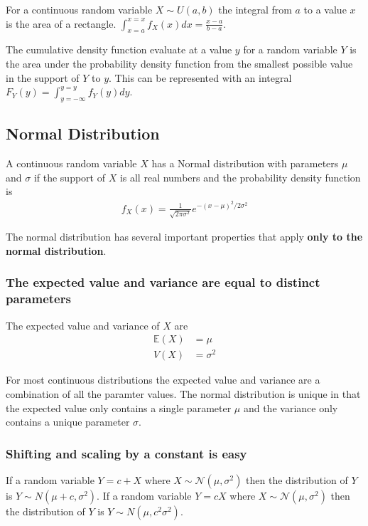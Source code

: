 \ex For a continuous random variable $X \sim U(a,b)$ the integral from $a$ to a value $x$ is the area of a rectangle. 
$\int_{x=a}^{x=x} f_{X}(x) dx = \frac{x-a}{b-a}$.

\ex The cumulative density function evaluate at a value $y$ for a random variable $Y$ is the area under the probability density function from the smallest possible value in the support of $Y$ to $y$. This can be represented with an integral $F_{Y}(y) = \int_{y=-\infty}^{y=y} f_{Y}(y) dy$. 

\subsection{Normal Distribution}

A continuous random variable $X$ has a Normal distribution with parameters $\mu$ and $\sigma$ if the support of $X$ is all real numbers and the probability density function is 
\begin{align}
    f_{X}(x) = \frac{1}{\sqrt{2 \pi \sigma^{2}}} e^{ - (x - \mu)^{2} / 2\sigma^{2}  }
\end{align}

The normal distribution has several important properties that apply \textbf{only to the normal distribution}. 

\subsubsection{The expected value and variance are equal to distinct parameters}

The expected value and variance of $X$ are 
\begin{align}
    \mathbb{E}(X) &= \mu\\
             V(X) &= \sigma^{2} 
\end{align}

For most continuous distributions the expected value and variance are a combination of all the paramter values. The normal distribution is unique in that the expected value only contains a single parameter $\mu$ and the variance only contains a unique parameter $\sigma$.

\subsubsection{Shifting and scaling by a constant is easy}

If a random variable $Y = c + X$ where $X \sim \mathcal{N}(\mu,\sigma^{2})$ then the distribution of $Y$ is $Y \sim N(\mu + c, \sigma^{2})$.
%
If a random variable $Y = cX$ where $X \sim \mathcal{N}(\mu,\sigma^{2})$ then the distribution of $Y$ is $Y \sim N(\mu, c^{2}\sigma^{2})$.

